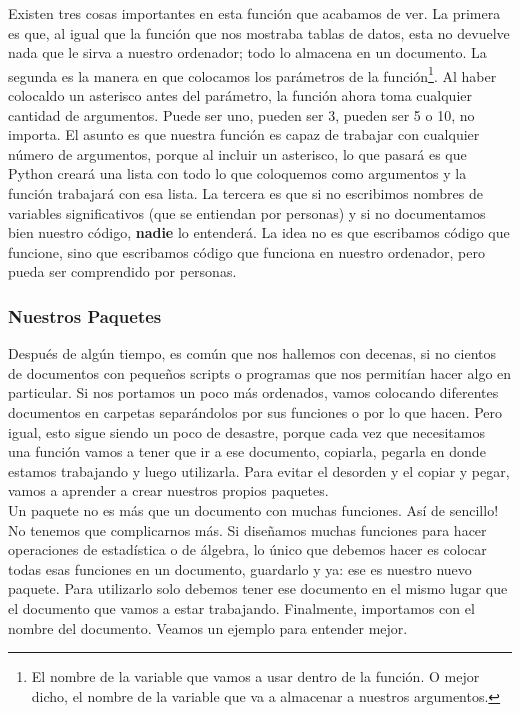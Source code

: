 \documentclass[10pt,letterpaper]{article}
\begin{document}
Existen tres cosas importantes en esta funci\'on que acabamos de ver. La primera es que, al igual que la funci\'on que nos mostraba tablas de datos, esta no devuelve nada que le sirva a nuestro ordenador; todo lo almacena en un documento. La segunda es la manera en que colocamos los par\'ametros de la funci\'on\footnote{El nombre de la variable que vamos a usar dentro de la funci\'on. O mejor dicho, el nombre de la variable que va a almacenar a nuestros argumentos.}. Al haber colocaldo un asterisco antes del par\'ametro, la funci\'on ahora toma cualquier cantidad de argumentos. Puede ser uno, pueden ser 3, pueden ser 5 o 10, no importa. El asunto es que nuestra funci\'on es capaz de trabajar con cualquier n\'umero de argumentos, porque al incluir un asterisco, lo que pasar\'a es que Python crear\'a una lista con todo lo que coloquemos como argumentos y la funci\'on trabajar\'a con esa lista. La tercera es que si no escribimos nombres de variables significativos (que se entiendan por personas) y si no documentamos bien nuestro c\'odigo, \textbf{nadie} lo entender\'a. La idea no es que escribamos c\'odigo que funcione, sino que escribamos c\'odigo que funciona en nuestro ordenador, pero pueda ser comprendido por personas.

\subsubsection{Nuestros Paquetes}
Despu\'es de alg\'un tiempo, es com\'un que nos hallemos con decenas, si no cientos de documentos con peque\~nos scripts o programas que nos permit\'ian hacer algo en particular. Si nos portamos un poco m\'as ordenados, vamos colocando diferentes documentos en carpetas separ\'andolos por sus funciones o por lo que hacen. Pero igual, esto sigue siendo un poco de desastre, porque cada vez que necesitamos una funci\'on vamos a tener que ir a ese documento, copiarla, pegarla en donde estamos trabajando y luego utilizarla. Para evitar el desorden y el copiar y pegar, vamos a aprender a crear nuestros propios paquetes.\\

Un paquete no es m\'as que un documento con muchas funciones. As\'i de sencillo! No tenemos que complicarnos m\'as. Si dise\~namos muchas funciones para hacer operaciones de estad\'istica o de \'algebra, lo \'unico que debemos hacer es colocar todas esas funciones en un documento, guardarlo y ya: ese es nuestro nuevo paquete. Para utilizarlo solo debemos tener ese documento en el mismo lugar que el documento que vamos a estar trabajando. Finalmente, importamos con el nombre del documento. Veamos un ejemplo para entender mejor.\\
\end{document}
